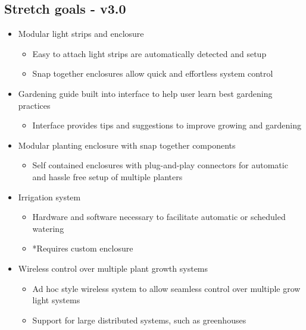 \documentclass[onecolumn, draftclsnofoot,10pt, compsoc]{IEEEtran}
\begin{document}
		\subsection*{Stretch goals - v3.0}
		\begin{itemize}
			\item Modular light strips and enclosure
				\begin{itemize}
					\item Easy to attach light strips are automatically detected and setup
					\item Snap together enclosures allow quick and effortless system control
				\end{itemize}
			\item Gardening guide built into interface to help user learn best gardening practices
				\begin{itemize}
					\item Interface provides tips and suggestions to improve growing and gardening
				\end{itemize}
			\item Modular planting enclosure with snap together components
				\begin{itemize}
					\item Self contained enclosures with plug-and-play connectors for automatic and hassle free setup of multiple planters
				\end{itemize}
			\item Irrigation system
				\begin{itemize}
					\item Hardware and software necessary to facilitate automatic or scheduled watering
					\item *Requires custom enclosure
				\end{itemize}
			\item Wireless control over multiple plant growth systems
				\begin{itemize}
					\item Ad hoc style wireless system to allow seamless control over multiple grow light systems
					\item Support for large distributed systems, such as greenhouses
				\end{itemize}
		\end{itemize}
\end{document}

